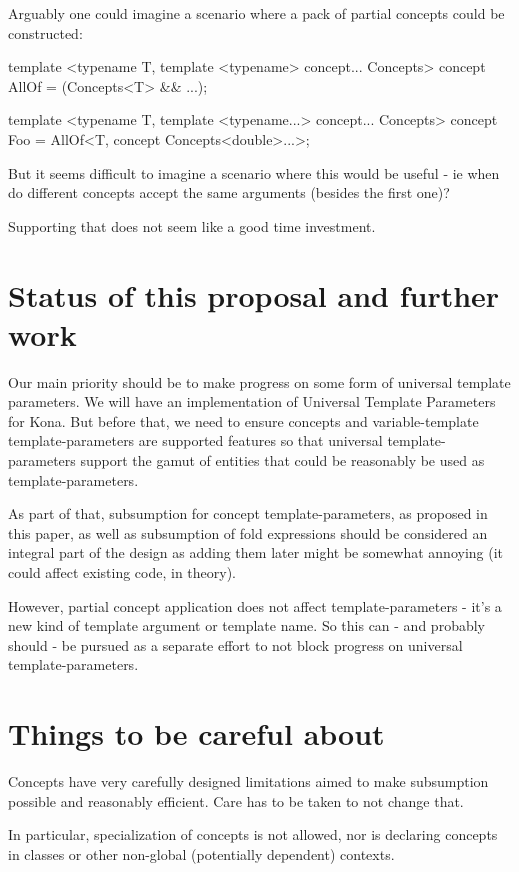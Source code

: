 \documentclass{wg21}
\begin{document}
Arguably one could imagine a scenario where a pack of partial concepts could be constructed:

\begin{colorblock}
template <typename T, template <typename> concept... Concepts>
concept AllOf  = (Concepts<T> && ...);

template <typename T, template <typename...> concept... Concepts>
concept Foo = AllOf<T, concept Concepts<double>...>;
\end{colorblock}

But it seems difficult to imagine a scenario where this would be useful - ie when do different concepts accept the same arguments (besides the first one)?

Supporting that does not seem like a good time investment.

\section{Status of this proposal and further work}

Our main priority should be to make progress on some form of universal template parameters.
We will have an implementation of Universal Template Parameters for Kona.
But before that, we need to ensure concepts and variable-template template-parameters are supported features so that universal
template-parameters support the gamut of entities that could be reasonably be used as template-parameters.

As part of that, subsumption for concept template-parameters, as proposed in this paper, as well as subsumption of fold expressions
should be considered an integral part of the design as adding them later might be somewhat annoying (it could affect existing code, in theory).

However, partial concept application does not affect template-parameters - it's a new kind of template argument or template name.
So this can - and probably should - be pursued as a separate effort to not block progress on universal template-parameters.

\section{Things to be careful about}

Concepts have very carefully designed limitations aimed to make subsumption possible and reasonably efficient.
Care has to be taken to not change that.

In particular, specialization of concepts is not allowed, nor is declaring concepts in classes or other non-global (potentially dependent)
contexts.
\end{document}
